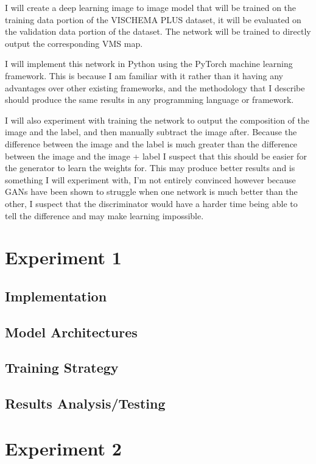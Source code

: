 \documentclass{UoYCSproject}
\begin{document}
I will create a deep learning image to image model that will be trained on the training data portion of the VISCHEMA PLUS dataset, it will be evaluated on the validation data portion of the dataset. The network will be trained to directly output the corresponding VMS map.

I will implement this network in Python using the PyTorch machine learning framework. This is because I am familiar with it rather than it having any advantages over other existing frameworks, and the methodology that I describe should produce the same results in any programming language or framework.

I will also experiment with training the network to output the composition of the image and the label, and then manually subtract the image after. Because the difference between the image and the label is much greater than the difference between the image and the image + label I suspect that this should be easier for the generator to learn the weights for. This may produce better results and is something I will experiment with, I'm not entirely convinced however because GANs have been shown to struggle when one network is much better than the other, I suspect that the discriminator would have a harder time being able to tell the difference and may make learning impossible. 

\section{Experiment 1}

\subsection{Implementation}
\subsection{Model Architectures}
\subsection{Training Strategy}
\subsection{Results Analysis/Testing}

\section{Experiment 2}
\end{document}
